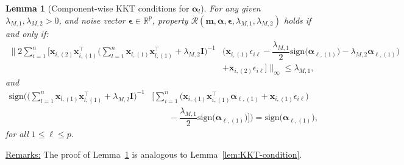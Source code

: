 \documentclass[
  12pt]{article}
\newtheorem{lem}[thm]{Lemma}
\def\R{\mathbb{R}}
\def\M{\mathbf{m}}
\def\X{\mathbf{x}}
\begin{document}
\begin{lem} [Component-wise KKT conditions for $\bm{\alpha}_l$]
\label{lem:KKT-condition-alpha}
For any given $ \lambda_{M,1},\lambda_{M,2}  > 0$, and noise vector $\bm{\epsilon} \in \R^{p}$, property $\mathcal{R}(\M, \bm{\alpha}, \bm{\epsilon}, \lambda_{M,1}, \lambda_{M,2})$ holds if and only if:
\em{  \begin{align}
    \Big\|  2  \sum_{i=1}^{n}  \Big[   \X_{i,(2)} \X_{i,(1)}^{\top}  \Big( \sum_{l = 1}^{n}  \X_{l , (1)} \X_{l , (1)}^{\top}  +  \lambda_{M,2} \mathbf{I} \Big)^{-1}
    &\Big( \X_{i,(1)} \epsilon_{i \ell}  -  \dfrac{\lambda_{M,1}}{2} \textrm{sign} \big( \bm{\alpha}_{\ell,(1)} \big)  -  \lambda_{M,2} \bm{\alpha}_{\ell,(1)} \Big)
    \nonumber
    \\
    &+  \X_{i,(2)}   \epsilon_{i \ell}   \Big]   \Big\|_{\infty}
    \leq  \lambda_{M,1},
    \label{lem:KKT-condition-alpha:condition1}
\end{align} }
and
{  \begin{align}
    \textrm{sign} \Bigg(  \Big(  \sum_{l = 1}^{n} \X_{l,(1)}   \X_{l , (1)}^{\top}   +  \lambda_{M,2} \mathbf{I}      \Big)^{-1}
    &\Big[   \sum_{i=1}^{n} \Big( \X_{i, (1)} \X_{i, (1)}^{\top}  \bm{\alpha}_{\ell , (1)}  +  \X_{i,(1)}   \epsilon_{i \ell} \Big)
    \nonumber
    \\
    & \qquad  -   \dfrac{\lambda_{M,1}}{2} \textrm{sign} \big( \bm{\alpha}_{\ell,(1)} \big)  \Big]    \Bigg)  =  \textrm{sign} \big( \bm{\alpha}_{\ell,(1)} \big) ,
\label{lem:KKT-condition-alpha:condition2}
\end{align}
for all $1 \leq  \ell  \leq  p$. }
\end{lem}
\underline{Remarks:} The proof of Lemma~\ref{lem:KKT-condition-alpha} is analogous to Lemma~\ref{lem:KKT-condition}.
\bigskip
\end{document}

